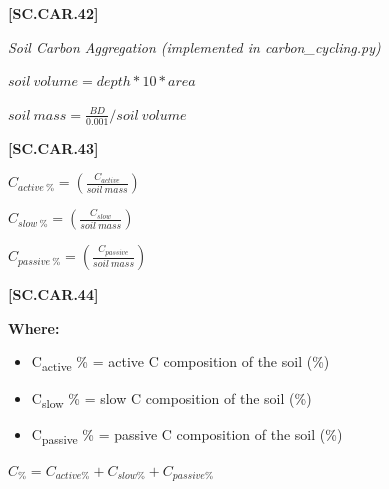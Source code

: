             {\raggedleft \textbf{[SC.CAR.42]}\par}
            \vspace{0.5cm}


\textit{Soil Carbon Aggregation (implemented in carbon\_cycling.py)}
        \vspace{0.5cm}

    \begin{center}
\(soil\ volume=depth * 10 * area	\)
\vspace{0.1cm}

\(soil\ mass=\frac{BD}{0.001} / soil\ volume\)
    \end{center}
        \vspace{0.5cm} 
    
            {\raggedleft \textbf{[SC.CAR.43]}\par}
            \vspace{0.5cm}

    \begin{center}
\(C_{active\ \%}=(\frac{C_{active}}{soil\ mass})\)
\vspace{0.1cm}

\(C_{slow\ \%}=(\frac{C_{slow}}{soil\ mass})\)
\vspace{0.1cm}

\(C_{passive\ \%}=(\frac{C_{passive}}{soil\ mass})\)

    \end{center}
        \vspace{0.5cm} 
    
            {\raggedleft \textbf{[SC.CAR.44]}\par}
            \vspace{0.5cm}

        \textbf{Where:}
            
        \begin{itemize}
            \item C\textsubscript{active} \%	=	active C composition of the soil (\%)
            \item C\textsubscript{slow}  \%	=	slow C composition of the soil (\%)
            \item C\textsubscript{passive}  \% = 	passive C composition of the soil (\%)
        \end{itemize}
        \vspace{0.5cm}

    \begin{center}
\(C_\%=C_{active\%}+C_{slow\%}+C_{passive\%}	\)

    \end{center}
        \vspace{0.5cm} 
    
